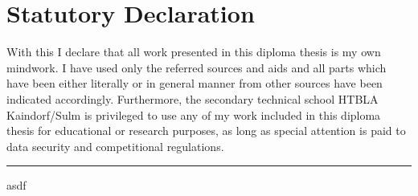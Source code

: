 \chapter*{Statutory Declaration}
With this I declare that all work presented in this diploma thesis is my own mindwork. I have used only the referred sources and aids and all parts which have been either literally or in general manner from other sources have been indicated accordingly.
\newline \newline
Furthermore, the secondary technical school HTBLA Kaindorf/Sulm is privileged to use any of my work included in this diploma thesis for educational or research purposes, as long as special attention is paid to data security and competitional regulations.
\par\bigskip

\par\bigskip

\par\bigskip

\par\bigskip

\par\bigskip

\par\bigskip

\par\bigskip

\par\bigskip

\par\bigskip

\par\bigskip

\par\bigskip

\par\bigskip

\rule{0.3\textwidth}{0.4pt}

asdf